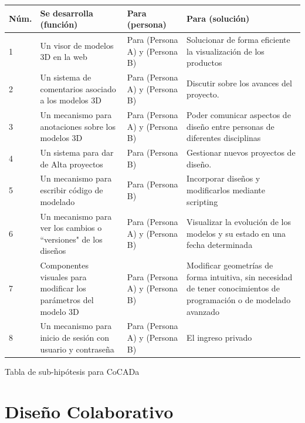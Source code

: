 \begin{longtable}{|p{1cm}|p{4cm}|p{4cm}|p{4cm}| }

\hline
    Núm. & Se desarrolla (función) & Para (persona)  & Para (solución)\\
\hline
1 & Un visor de modelos 3D en la web & Para (Persona A) y  (Persona B) & Solucionar de forma eficiente la visualización de los productos \\

\hline
2 & Un sistema de comentarios asociado a los modelos 3D & Para (Persona A) y (Persona B)  & Discutir sobre los avances del proyecto.
\\

\hline
3 & Un mecanismo para anotaciones sobre los modelos 3D & Para (Persona A)  y (Persona B) & 
Poder comunicar aspectos de diseño entre personas de diferentes disciplinas  \\

\hline
4 & Un sistema para dar de Alta proyectos & Para (Persona B) & Gestionar nuevos proyectos de diseño.
\\

\hline
5 & Un mecanismo para escribir código de modelado & Para (Persona B) & Incorporar diseños y modificarlos mediante scripting \\
\hline
6 & Un mecanismo para ver los cambios o ``versiones" de los diseños & Para (Persona A) y (Persona B) & Visualizar la evolución de los modelos y su estado en una fecha determinada  \\
\hline

7 & Componentes visuales para modificar los parámetros del modelo 3D & Para (Persona A) y (Persona B) & Modificar geometrías de forma intuitiva, sin necesidad de tener conocimientos de programación o de modelado avanzado  \\

\hline
8 & Un mecanismo para inicio de sesión con usuario y contraseña & Para (Persona A) y (Persona B) & El ingreso privado  \\
\hline

\end{longtable}

\begin{center}
 \caption{\footnotesize{Tabla de sub-hipótesis para CoCADa}}
\end{center}

\clearpage
\section{Diseño Colaborativo}
\label{dis-des-colabo}
 
